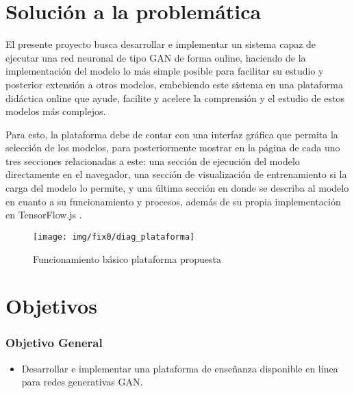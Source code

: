 \clearpage
\section{Solución a la problemática}
El presente proyecto busca desarrollar e implementar un sistema capaz de ejecutar una red neuronal de tipo GAN de forma online, haciendo de la implementación del modelo lo más simple posible para facilitar su estudio y posterior extensión a otros modelos, embebiendo este sistema en una plataforma didáctica online que ayude, facilite y acelere la comprensión y el estudio de estos modelos más complejos.

Para esto, la plataforma debe de contar con una interfaz gráfica que permita la selección de los modelos, para posteriormente mostrar en la página de cada uno tres secciones relacionadas a este: una sección de ejecución del modelo directamente en el navegador, una sección de visualización de entrenamiento si la carga del modelo lo permite,  y una última sección en donde se describa al modelo en cuanto a su funcionamiento y procesos, además de su propia implementación en TensorFlow.js .

\begin{figure}[h]
  \texttt{[image: img/fix0/diag\_plataforma]}
  \centering
  \caption{Funcionamiento básico plataforma propuesta}
  \label{fig:diag_plataforma}
\end{figure}



\clearpage
\section{Objetivos}

\subsubsection{Objetivo General}
\begin{itemize}
\item     Desarrollar e implementar una plataforma de enseñanza disponible en línea para redes generativas GAN.
\end{itemize}

